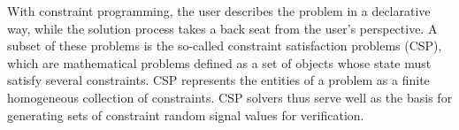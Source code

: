 \documentclass[conference]{IEEEtran}
\newcommand{\code}[1]{{\small{\texttt{#1}}}}
\newcommand{\hjd}[1]{{\color{pink} Hans: #1}}
\begin{document}

With constraint programming, the user describes the problem in a declarative way, while the solution process takes a back seat from the user's perspective. A subset of these problems is the so-called constraint satisfaction problems (CSP), which are mathematical problems defined as a set of objects whose state must satisfy several constraints. CSP represents the entities of a problem as a finite homogeneous collection of constraints. CSP solvers thus serve well as the basis for generating sets of constraint random signal values for verification.

%

\end{document}
